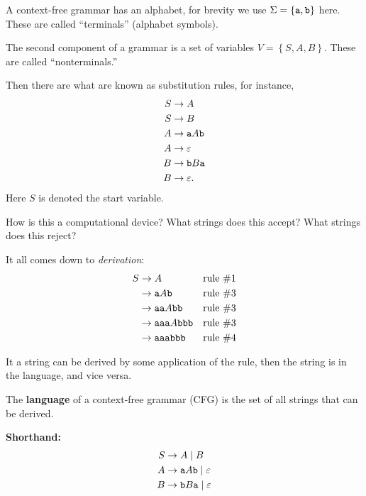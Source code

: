 \documentclass{notes}
\begin{document}
\begin{eg}
  A context-free grammar has an alphabet, for brevity we use $\Sigma = \left \{ \verb~a~, \verb~b~ \right \}$ here.
  These are called ``terminals'' (alphabet symbols).
  
  The second component of a grammar is a set of variables $V = \left \{ S, A, B \right \}$.
  These are called ``nonterminals.''
  
  Then there are what are known as substitution rules, for instance, 
  \begin{align*}
    S &\to A \\ 
    S &\to B \\ 
    A &\to \verb~a~ A \verb~b~ \\ 
    A &\to \varepsilon \\ 
    B &\to \verb~b~ B \verb~a~ \\ 
    B &\to \varepsilon.
  \end{align*}
  Here $S$ is denoted the start variable.
  
  How is this a computational device? What strings does this accept? What strings does this reject?

  It all comes down to \textit{derivation}: 
  \begin{align*}
    S &\to A & \text{rule \#1} \\ 
    &\to \verb~a~ A \verb~b~ & \text{rule \#3} \\ 
    &\to \verb~aa~ A \verb~bb~ & \text{rule \#3} \\ 
    &\to \verb~aaa~ A \verb~bbb~ & \text{rule \#3} \\ 
    &\to \verb~aaabbb~ & \text{rule \#4} 
  \end{align*}
  
  It a string can be derived by some application of the rule, then the string is in the language, and vice versa.
\end{eg}

\begin{defn}
  The {\boldmath \bfseries language} of a context-free grammar (CFG) is the set of all strings that can be derived.
\end{defn}

{\boldmath \bfseries Shorthand:} 
\begin{align*}
  S &\to A \; | \; B \\ 
  A &\to \verb~a~ A \verb~b~ \; | \; \varepsilon \\ 
  B &\to \verb~b~ B \verb~a~ \; | \; \varepsilon
\end{align*}
\end{document}
